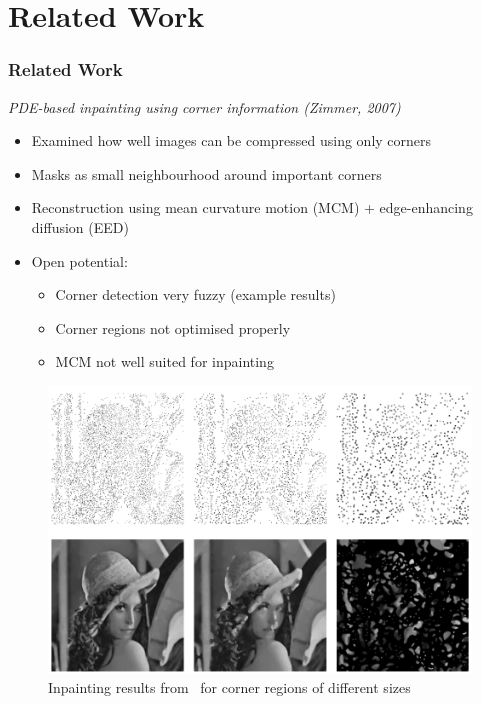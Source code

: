 \documentclass{beamer}
\begin{document}
    \section{Related Work}
    \begin{frame}[t]
        \frametitle{Related Work}
        \textit{PDE-based inpainting using corner information (Zimmer, 2007)}
         {
            \begin{itemize}
                \item<+-> Examined how well images can be compressed using only corners
                \item<+-> Masks as small neighbourhood around important corners
                \item<+-> Reconstruction using mean curvature motion (MCM) + edge-enhancing diffusion
                    (EED) 
                \item<+-> Open potential:
                    \begin{itemize}
                        \item Corner detection very fuzzy (example results) 
                        \item Corner regions not optimised properly
                        \item MCM not well suited for inpainting
                    \end{itemize}
            \end{itemize}     
        }
         {
            \vspace{-4cm}
            \begin{figure}
                \centering
                \includegraphics[width=0.7\linewidth]{../thesis/Images/zimmer_result.png}
                \caption{Inpainting results from~\cite{zimmer07} for corner regions of different sizes}
         \end{figure}
        }
    \end{frame}
\end{document}
